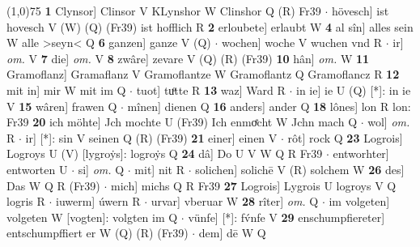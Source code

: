 \documentclass[8pt,a4paper,notitlepage]{article}
\begin{document}
\begin{table}[ht]
\begin{minipage}[t]{0.5\linewidth}
\line(1,0){75} \newline
\textbf{1} Clynsor] Clinsor V KLynshor W Clinshor Q (R) Fr39  $\cdot$ hövesch] ist hovesch V (W) (Q) (Fr39) ist hofflich R \textbf{2} erloubete] erlaubt W \textbf{4} al sîn] alles sein W alle >seyn< Q \textbf{6} ganzen] ganze V (Q)  $\cdot$ wochen] woche V wuchen vnd R  $\cdot$ ir] \textit{om.} V \textbf{7} die] \textit{om.} V \textbf{8} zwâre] zevare V (Q) (R) (Fr39) \textbf{10} hân] \textit{om.} W \textbf{11} Gramoflanz] Gramaflanz V Gramoflantze W Gramoflantz Q Gramoflancz R \textbf{12} mit in] mir W mit im Q  $\cdot$ tuot] tuͦtte R \textbf{13} waz] Ward R  $\cdot$ in ie] ie U (Q) [*]: in ie  V \textbf{15} wâren] frawen Q  $\cdot$ mînen] dienen Q \textbf{16} anders] ander Q \textbf{18} lônes] lon R lon: Fr39 \textbf{20} ich möhte] Jch mochte U (Fr39) Ich enmoͤcht W Jchn mach Q  $\cdot$ wol] \textit{om.} R  $\cdot$ ir] [*]: sin V seinen Q (R) (Fr39) \textbf{21} einer] einen V  $\cdot$ rôt] rock Q \textbf{23} Logrois] Logroys U (V) [lygroẏs]: logroẏs  Q \textbf{24} dâ] Do U V W Q R Fr39  $\cdot$ entworhter] entworten U  $\cdot$ si] \textit{om.} Q  $\cdot$ mit] nit R  $\cdot$ solichen] solichē V (R) solchem W \textbf{26} des] Das W Q R (Fr39)  $\cdot$ mich] michs Q R Fr39 \textbf{27} Logrois] Lygrois U logroys V Q logris R  $\cdot$ iuwerm] úwern R  $\cdot$ urvar] vberuar W \textbf{28} rîter] \textit{om.} Q  $\cdot$ im volgeten] volgeten W [vogten]: volgten im Q  $\cdot$ vünfe] [*]: fv́nfe V \textbf{29} enschumpfiereter] entschumpffiert er W (Q) (R) (Fr39)  $\cdot$ dem] dē W Q \newline
\end{minipage}
\end{table}
\end{document}
